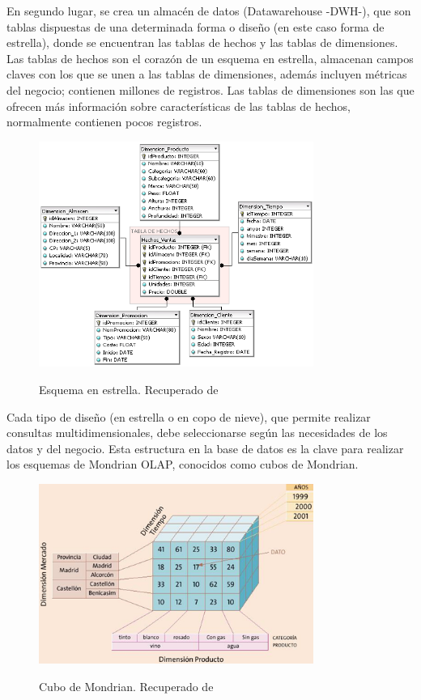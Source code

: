 En segundo lugar, se crea un almacén de datos (Datawarehouse -DWH-), que son tablas dispuestas de una determinada forma o diseño (en este caso forma de estrella), donde se encuentran las tablas de hechos y las tablas de dimensiones. Las tablas de hechos son el corazón de un esquema en estrella, almacenan campos claves con los que se unen a las tablas de dimensiones, además incluyen métricas del negocio; contienen millones de registros. Las tablas de dimensiones son las que ofrecen más información sobre características de las tablas de hechos, normalmente contienen pocos registros.
\begin{figure}[h]
	\centering
	\caption{Esquema en estrella. Recuperado de \protect{}}
	\includegraphics[width=0.8\textwidth]{recursos/Esquema_en_estrella}
	\label{fig:esquemaestrella}
\end{figure}
\FloatBarrier

Cada tipo de diseño (en estrella o en copo de nieve), que permite realizar consultas multidimensionales, debe seleccionarse según las necesidades de los datos y del negocio. Esta estructura en la base de datos es la clave para realizar los esquemas de Mondrian OLAP, conocidos como cubos de Mondrian. \cite{MONDRIAN}

\begin{figure}[h]
	\centering
	\caption{Cubo de Mondrian. Recuperado de \protect{}}
	\includegraphics[width=0.8\textwidth]{recursos/modelo-dimensional-cubo}
	\label{fig:modelo-dimensional-cubo}
\end{figure}
\FloatBarrier

